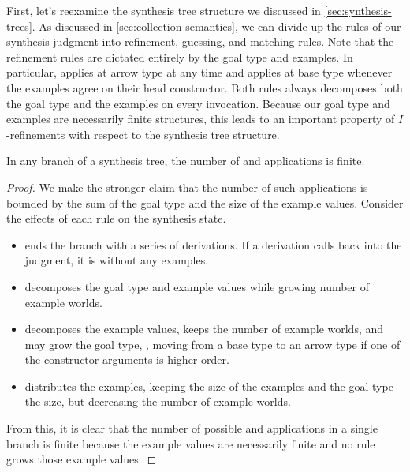 First, let's reexamine the synthesis tree structure we discussed in \autoref{sec:synthesis-trees}.
As discussed in \autoref{sec:collection-semantics}, we can divide up the rules of our synthesis judgment into refinement, guessing, and matching rules.
Note that the refinement rules are dictated entirely by the goal type and examples.
In particular,  applies at arrow type at any time and  applies at base type whenever the examples agree on their head constructor.
Both rules always decomposes both the goal type and the examples on every invocation.
Because our goal type and examples are necessarily finite structures, this leads to an important property of $I$-refinements with respect to the synthesis tree structure.
\begin{proofenv}
  \begin{lemma}
    \label{lem:finiteness-of-refinement-derivations}
    In any branch of a synthesis tree, the number of  and  applications is finite.
  \end{lemma}
  \begin{proof}
    We make the stronger claim that the number of such applications is bounded by the sum of the goal type and the size of the example values.
    Consider the effects of each  rule on the synthesis state.
    \begin{itemize}
      \item {} ends the branch with a series of  derivations.
        If a  derivation calls back into the  judgment, it is without any examples.
      \item {} decomposes the goal type and example values while growing number of example worlds.
      \item {} decomposes the example values, keeps the number of example worlds, and may grow the goal type, \eg, moving from a base type to an arrow type if one of the constructor arguments is higher order.
      \item {} distributes the examples, keeping the size of the examples and the goal type the size, but decreasing the number of example worlds.
    \end{itemize}
    From this, it is clear that the number of possible  and  applications in a single branch is finite because the example values are necessarily finite and no  rule grows those example values.
  \end{proof}
\end{proofenv}

